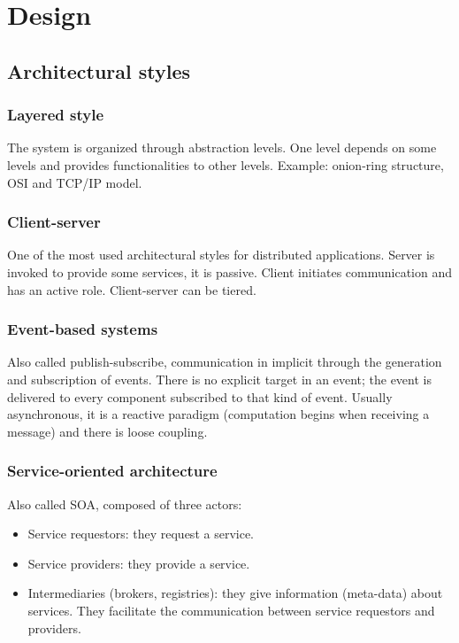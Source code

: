 \section{Design}
\subsection{Architectural styles}
\subsubsection{Layered style}
The system is organized through abstraction levels.
One level depends on some levels and provides functionalities to other levels.
Example: onion-ring structure, OSI and TCP/IP model.

\subsubsection{Client-server}
One of the most used architectural styles for distributed applications.
Server is invoked to provide some services, it is passive.
Client initiates communication and has an active role.
Client-server can be tiered.

\subsubsection{Event-based systems}
Also called publish-subscribe, communication in implicit through the generation and subscription of events.
There is no explicit target in an event; the event is delivered to every component subscribed to that kind of event.
Usually asynchronous, it is a reactive paradigm (computation begins when receiving a message) and there is loose coupling.

\subsubsection{Service-oriented architecture}
Also called SOA, composed of three actors:
\begin{itemize}
    \item Service requestors: they request a service.
    \item Service providers: they provide a service.
    \item Intermediaries (brokers, registries): they give information (meta-data) about services.
    They facilitate the communication between service requestors and providers.
\end{itemize}

